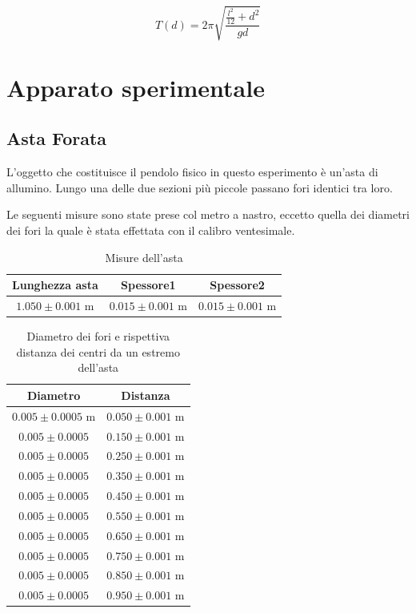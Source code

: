 \documentclass[11pt]{article}
\begin{document}
\begin{equation}
T(d)=2\pi\sqrt{\frac{\frac{l^2}{12}+d^2}{gd}}
\end{equation}

\section{Apparato sperimentale}
\subsection{Asta Forata}
L'oggetto che costituisce il pendolo fisico in questo esperimento è un'asta di allumino.
Lungo  una delle due sezioni più piccole passano fori identici  tra loro.

Le seguenti misure sono state prese col metro a nastro, eccetto quella dei diametri dei fori la quale è  stata effettata con il calibro ventesimale.

\begin{table}
\centering

\caption{Misure dell'asta}
\begin{tabular}[t]{|c|c|c|}
 Lunghezza asta &Spessore1&Spessore2\\
  \hline
  $1.050 \pm 0.001$ m & $0.015 \pm 0.001$ m & $0.015 \pm 0.001$ m \\
\end{tabular}

\end{table}


\begin{table}
    \centering
\caption{Diametro dei fori e rispettiva distanza dei centri da un estremo dell'asta}
    \label{tab:lunghezza-asta}
    \begin{tabular}{|c|c|}
        \hline
        Diametro & Distanza\\
        \hline
         $0.005 \pm 0.0005$ m & $0.050 \pm 0.001$ m \\
        $0.005 \pm 0.0005$ & $0.150 \pm 0.001$ m \\
        $0.005 \pm 0.0005$ & $0.250\pm 0.001$ m \\
        $0.005 \pm 0.0005$ & $0.350 \pm 0.001$ m \\
        $0.005 \pm 0.0005$ & $0.450 \pm 0.001$ m \\
        $0.005 \pm 0.0005$  & $0.550 \pm 0.001$ m \\
        $0.005 \pm 0.0005$ & $0.650 \pm 0.001$ m \\
       $0.005 \pm 0.0005$ & $0.750 \pm 0.001$ m \\
       $0.005 \pm 0.0005$ & $0.850 \pm 0.001$ m \\
        $0.005 \pm 0.0005$ & $0.950 \pm 0.001$ m \\
        \hline
    \end{tabular}
\end{table}
\end{document}
